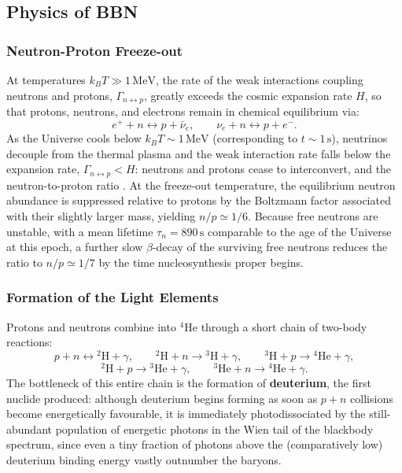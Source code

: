 \vspace{-2.5em}

\subsection{Physics of BBN} \label{subsec:bbn_physics}

\subsubsection{Neutron-Proton Freeze-out} \label{subsubsec:np_freezeout}

At temperatures $k_BT \gg 1\,\text{MeV}$, the rate of the weak interactions coupling neutrons and protons, $\Gamma_{n\leftrightarrow p}$, greatly exceeds the cosmic expansion rate $H$, so that protons, neutrons, and electrons remain in chemical equilibrium via:
$$
e^+ + n \leftrightarrow p + \bar\nu_e , \qquad \nu_e + n \leftrightarrow p + e^- .
$$
As the Universe cools below $k_BT \sim 1\,\text{MeV}$ (corresponding to $t \sim 1\,\text{s}$), neutrinos decouple from the thermal plasma and the weak interaction rate falls below the expansion rate, $\Gamma_{n\leftrightarrow p} < H$: neutrons and protons cease to interconvert, and the neutron-to-proton ratio . At the freeze-out temperature, the equilibrium neutron abundance is suppressed relative to protons by the Boltzmann factor associated with their slightly larger mass, yielding $n/p \simeq 1/6$. Because free neutrons are unstable, with a mean lifetime $\tau_n = 890\,\text{s}$ comparable to the age of the Universe at this epoch, a further slow $\beta$-decay of the surviving free neutrons reduces the ratio to $n/p \simeq 1/7$ by the time nucleosynthesis proper begins.

\subsubsection{Formation of the Light Elements} \label{subsubsec:light_element_formation}

Protons and neutrons combine into $^4\text{He}$ through a short chain of two-body reactions:
$$
p + n \leftrightarrow {}^2\text{H} + \gamma , \qquad
{}^2\text{H} + n \to {}^3\text{H} + \gamma , \qquad
{}^3\text{H} + p \to {}^4\text{He} + \gamma ,
$$
$$
{}^2\text{H} + p \to {}^3\text{He} + \gamma , \qquad
{}^3\text{He} + n \to {}^4\text{He} + \gamma .
$$
The bottleneck of this entire chain is the formation of \textbf{deuterium}, the first nuclide produced: although deuterium begins forming as soon as $p + n$ collisions become energetically favourable, it is immediately photodissociated by the still-abundant population of energetic photons in the Wien tail of the blackbody spectrum, since even a tiny fraction of photons above the (comparatively low) deuterium binding energy vastly outnumber the baryons. 

